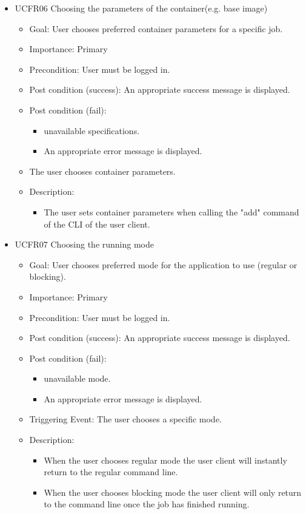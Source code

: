 \begin{itemize}
  \item  UCFR06 Choosing the parameters of the container(e.g. base image)
    \begin{itemize}
      \item Goal: User chooses preferred container parameters for a specific job.
      \item Importance: Primary
      \item Precondition: User must be logged in.
      \item Post condition (success): An appropriate success message is displayed.
      \item Post condition (fail):
        \begin{itemize}
          \item unavailable specifications.
          \item An appropriate error message is displayed.
        \end{itemize}
      \item The user chooses container parameters.
      \item Description:
        \begin{itemize}
          \item The user sets container parameters when calling the "add" command of the CLI of the user client.
        \end{itemize}
    \end{itemize}

  \item  UCFR07 Choosing the running mode
    \begin{itemize}
      \item Goal: User chooses preferred mode for the application to use (regular or blocking).
      \item Importance: Primary
      \item Precondition: User must be logged in.
      \item Post condition (success): An appropriate success message is displayed.
      \item Post condition (fail):
        \begin{itemize}
          \item unavailable mode.
          \item An appropriate error message is displayed.
        \end{itemize}
      \item Triggering Event: The user chooses a specific mode.
      \item Description:
        \begin{itemize}
          \item When the user chooses regular mode the user client will instantly return to the regular command line.
          \item When the user chooses blocking mode the user client will only return to the command line once the job has finished running.
        \end{itemize}
    \end{itemize}


\end{itemize}
